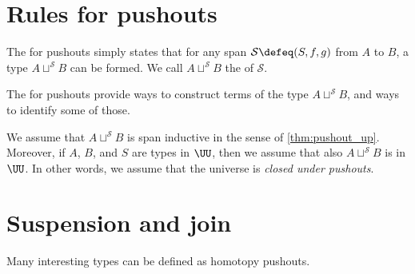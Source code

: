 \section{Rules for pushouts}

The  for pushouts simply states that for any span $\mathcal{S}\defeq (S,f,g)$ from $A$ to $B$, a type $A\sqcup^{\mathcal{S}} B$ can be formed. We call $A\sqcup^{\mathcal{S}} B$ the  of $\mathcal{S}$. 

\begin{prooftree}
\end{prooftree}

The  for pushouts provide ways to construct terms of the type $A\sqcup^{\mathcal{S}} B$, and ways to identify some of those.
\begin{prooftree}
\end{prooftree}

\begin{prooftree}
\end{prooftree}

\begin{prooftree}
\end{prooftree}
We assume that $A\sqcup^{\mathcal{S}} B$ is span inductive in the sense of \autoref{thm:pushout_up}. Moreover, if $A$, $B$, and $S$ are types in $\UU$, then we assume that also $A\sqcup^{\mathcal{S}} B$ is in $\UU$. In other words, we assume that the universe is \emph{closed under pushouts}.

\section{Suspension and join}
Many interesting types can be defined as homotopy pushouts. 

